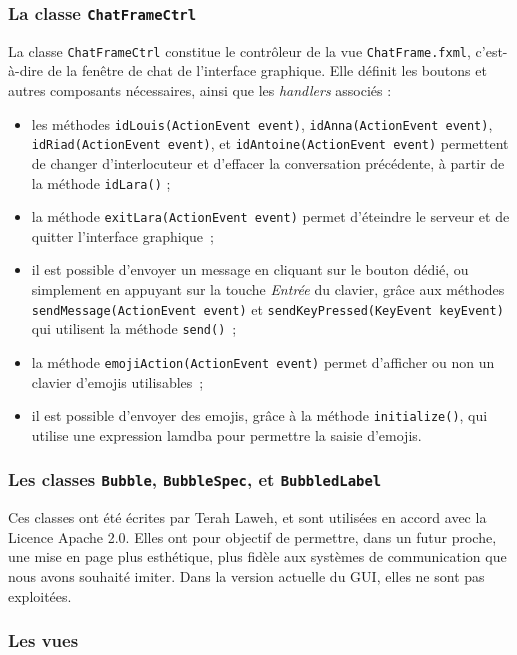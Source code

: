 \documentclass[10pt,a4paper]{article}
\begin{document}
\subsubsection{La classe \texttt{ChatFrameCtrl}}

La classe \texttt{ChatFrameCtrl} constitue le contrôleur de la vue \texttt{ChatFrame.fxml}, c'est-à-dire de la fenêtre de chat de l'interface graphique. Elle définit les boutons et autres composants nécessaires, ainsi que les \textit{handlers} associés :

\begin{itemize}
	\item les méthodes \texttt{idLouis(ActionEvent event)}, \texttt{idAnna(ActionEvent event)}, \texttt{idRiad(ActionEvent event)}, et \texttt{idAntoine(ActionEvent event)} permettent de changer d'interlocuteur et d'effacer la conversation précédente, à partir de la méthode \texttt{idLara()} ;
	\item la méthode \texttt{exitLara(ActionEvent event)} permet d'éteindre le serveur et de quitter l'interface graphique ;
	\item il est possible d'envoyer un message en cliquant sur le bouton dédié, ou simplement en appuyant sur la touche \textit{Entrée} du clavier, grâce aux méthodes \texttt{sendMessage(ActionEvent event)} et \texttt{sendKeyPressed(KeyEvent keyEvent)} qui utilisent la méthode \texttt{send()} ;
	\item la méthode \texttt{emojiAction(ActionEvent event)} permet d'afficher ou non un clavier d'emojis utilisables ;
	\item il est possible d'envoyer des emojis, grâce à la méthode \texttt{initialize()}, qui utilise une expression lamdba pour permettre la saisie d'emojis.
\end{itemize}

\subsubsection{Les classes \texttt{Bubble}, \texttt{BubbleSpec}, et \texttt{BubbledLabel}}

Ces classes ont été écrites par Terah Laweh, et sont utilisées en accord avec la Licence Apache 2.0. Elles ont pour objectif de permettre, dans un futur proche, une mise en page plus esthétique, plus fidèle aux systèmes de communication que nous avons souhaité imiter. Dans la version actuelle du GUI, elles ne sont pas exploitées.


\subsubsection{Les vues}
\end{document}
